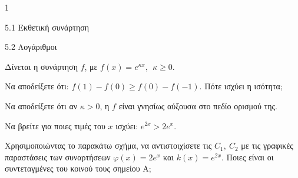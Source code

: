 \begin{ylh}{1}
\item 5.1 Εκθετική συνάρτηση
\item 5.2 Λογάριθμοι
\end{ylh}
Δίνεται η συνάρτηση $f$, με $f(x) = e^{\kappa x},\ \ \kappa \geq 0$.
\begin{alist}
\item Να αποδείξετε ότι: $f(1) - f(0) \geq f(0) - f( - 1)$. Πότε ισχύει η ισότητα;
\item Να αποδείξετε ότι αν $\kappa > 0$, η $f$ είναι γνησίως αύξουσα στο πεδίο ορισμού της.
\item
\begin{rlist}
\item
  Να βρείτε για ποιες τιμές του $x$ ισχύει: $e^{2x} > 2e^{x}$.
\item
  Χρησιμοποιώντας το παρακάτω σχήμα, να αντιστοιχίσετε τις $C_{1},\ C_{2}$ με τις γραφικές παραστάσεις των συναρτήσεων $\varphi(x) = 2e^{x}$ και $k(x) = e^{2x}$.
Ποιες είναι οι συντεταγμένες του κοινού τους σημείου Α;
\begin{center}
\end{center}
\end{rlist}
\end{alist}


